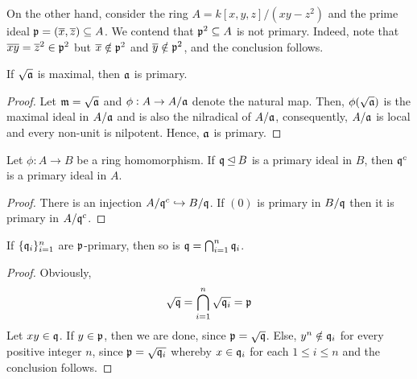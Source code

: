 On the other hand, consider the ring $A = k[x,y,z]/(xy - z^2)$ and the prime ideal $\mathfrak p = (\overline x,\overline z)\subseteq A$. We contend that $\mathfrak p^2\subseteq A$ is not primary. Indeed, note that $\overline x\overline y = \overline z^2\in\mathfrak p^2$ but $\overline x\notin\mathfrak p^2$ and $\overline y\notin\mathfrak p^2$, and the conclusion follows.

\begin{proposition}
    If $\sqrt{\mathfrak a}$ is maximal, then $\mathfrak a$ is primary.
\end{proposition}
\begin{proof}
    Let $\mathfrak m = \sqrt{\mathfrak a}$ and $\phi: A\to A/\mathfrak a$ denote the natural map. Then, $\phi(\sqrt{\mathfrak a})$ is the maximal ideal in $A/\mathfrak a$ and is also the nilradical of $A/\mathfrak a$, consequently, $A/\mathfrak a$ is local and every non-unit is nilpotent. Hence, $\mathfrak a$ is primary.
\end{proof}

\begin{proposition}
    Let $\phi: A\to B$ be a ring homomorphism. If $\mathfrak q\unlhd B$ is a primary ideal in $B$, then $\mathfrak q^c$ is a primary ideal in $A$.
\end{proposition}
\begin{proof}
    There is an injection $A/\mathfrak q^c\hookrightarrow B/\mathfrak q$. If $(0)$ is primary in $B/\mathfrak q$ then it is primary in $A/\mathfrak q^c$.
\end{proof}

\begin{lemma}
    If $\{\mathfrak q_i\}_{i = 1}^n$ are $\mathfrak p$-primary, then so is $\mathfrak q=\bigcap_{i = 1}^n\mathfrak q_i$.
\end{lemma}
\begin{proof}
    Obviously, 
    \begin{equation*}
        \sqrt{\mathfrak q} = \bigcap_{i = 1}^n\sqrt{\mathfrak q_i} = \mathfrak p
    \end{equation*}
    Let $xy\in\mathfrak q$. If $y\in\mathfrak p$, then we are done, since $\mathfrak p = \sqrt{\mathfrak q}$. Else, $y^n\notin\mathfrak q_i$ for every positive integer $n$, since $\mathfrak p = \sqrt{\mathfrak q_i}$ whereby $x\in\mathfrak q_i$ for each $1\le i\le n$ and the conclusion follows.
\end{proof}

